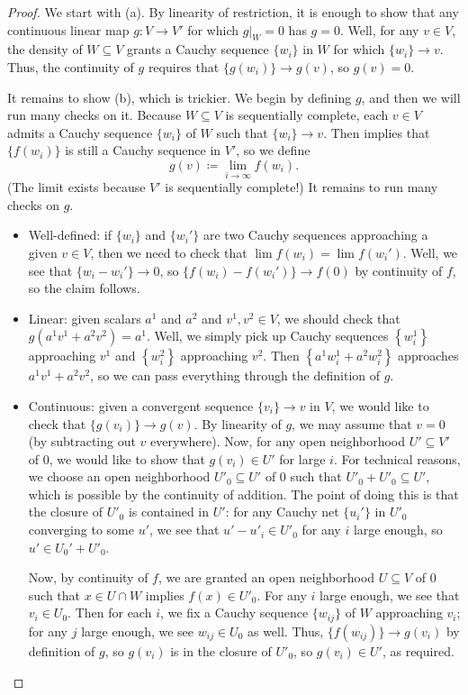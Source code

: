 \documentclass[notes.tex]{subfiles}
\begin{document}
\begin{proof}
	We start with (a). By linearity of restriction, it is enough to show that any continuous linear map $g\colon V\to V'$ for which $g|_W=0$ has $g=0$. Well, for any $v\in V$, the density of $W\subseteq V$ grants a Cauchy sequence $\{w_i\}$ in $W$ for which $\{w_i\}\to v$. Thus, the continuity of $g$ requires that $\{g(w_i)\}\to g(v)$, so $g(v)=0$.

	It remains to show (b), which is trickier. We begin by defining $g$, and then we will run many checks on it. Because $W\subseteq V$ is sequentially complete, each $v\in V$ admits a Cauchy sequence $\{w_i\}$ of $W$ such that $\{w_i\}\to v$. Then  implies that $\{f(w_i)\}$ is still a Cauchy sequence in $V'$, so we define
	\[g(v)\coloneqq\lim_{i\to\infty}f(w_i).\]
	(The limit exists because $V'$ is sequentially complete!) It remains to run many checks on $g$.
	\begin{itemize}
		\item Well-defined: if $\{w_i\}$ and $\{w_i'\}$ are two Cauchy sequences approaching a given $v\in V$, then we need to check that $\lim f(w_i)=\lim f(w_i')$. Well, we see that $\{w_i-w_i'\}\to0$, so $\{f(w_i)-f(w_i')\}\to f(0)$ by continuity of $f$, so the claim follows.

		\item Linear: given scalars $a^1$ and $a^2$ and $v^1,v^2\in V$, we should check that $g\left(a^1v^1+a^2v^2\right)=a^1$. Well, we simply pick up Cauchy sequences $\left\{w^1_i\right\}$ approaching $v^1$ and $\left\{w^2_i\right\}$ approaching $v^2$. Then $\left\{a^1w^1_i+a^2w^2_i\right\}$ approaches $a^1v^1+a^2v^2$, so we can pass everything through the definition of $g$.

		\item Continuous: given a convergent sequence $\{v_i\}\to v$ in $V$, we would like to check that $\{g(v_i)\}\to g(v)$. By linearity of $g$, we may assume that $v=0$ (by subtracting out $v$ everywhere). Now, for any open neighborhood $U'\subseteq V'$ of $0$, we would like to show that $g(v_i)\in U'$ for large $i$. For technical reasons, we choose an open neighborhood $U'_0\subseteq U'$ of $0$ such that $U'_0+U'_0\subseteq U'$, which is possible by the continuity of addition. The point of doing this is that the closure of $U'_0$ is contained in $U'$: for any Cauchy net $\{u_i'\}$ in $U'_0$ converging to some $u'$, we see that $u'-u'_i\in U'_0$ for any $i$ large enough, so $u'\in U_0'+U'_0$.

		Now, by continuity of $f$, we are granted an open neighborhood $U\subseteq V$ of $0$ such that $x\in U\cap W$ implies $f(x)\in U'_0$. For any $i$ large enough, we see that $v_i\in U_0$. Then for each $i$, we fix a Cauchy sequence $\{w_{ij}\}$ of $W$ approaching $v_i$; for any $j$ large enough, we see $w_{ij}\in U_0$ as well. Thus, $\{f(w_{ij})\}\to g(v_i)$ by definition of $g$, so $g(v_i)$ is in the closure of $U'_0$, so $g(v_i)\in U'$, as required.
		\qedhere
	\end{itemize}
\end{proof}
\end{document}
